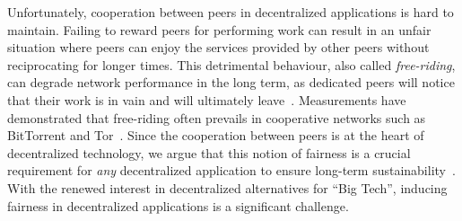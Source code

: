 Unfortunately, cooperation between peers in decentralized applications is hard to maintain.
Failing to reward peers for performing work can result in an unfair situation where peers can enjoy the services provided by other peers without reciprocating for longer times.
This detrimental behaviour, also called \emph{free-riding}, can degrade network performance in the long term, as dedicated peers will notice that their work is in vain and will ultimately leave~\cite{locher2006free}.
Measurements have demonstrated that free-riding often prevails in cooperative networks such as BitTorrent and Tor~\cite{sirivianos2007free}.
Since the cooperation between peers is at the heart of decentralized technology, we argue that this notion of fairness is a crucial requirement for \emph{any} decentralized application to ensure long-term sustainability~\cite{jelasity2004detection}.
With the renewed interest in decentralized alternatives for \enquote{Big Tech}, inducing fairness in decentralized applications is a significant challenge.



